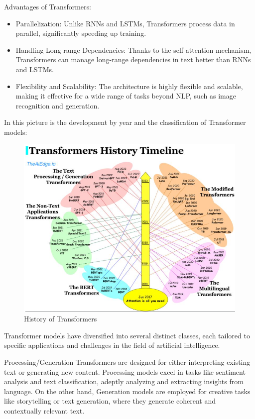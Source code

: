 Advantages of Transformers:

\begin{itemize}
    \item Parallelization: Unlike RNNs and LSTMs, Transformers process data in parallel, significantly speeding up training.
    \item Handling Long-range Dependencies: Thanks to the self-attention mechanism, Transformers can manage long-range dependencies in text better than RNNs and LSTMs.
    \item Flexibility and Scalability: The architecture is highly flexible and scalable, making it effective for a wide range of tasks beyond NLP, such as image recognition and generation.
\end{itemize}

In this picture is the development by year and the classification of Transformer models:

\begin{figure}[h]
    \centering
    \includegraphics[width=0.8\linewidth]{img/chap04/transformer-history.png}
    \caption{History of Transformers}
    \label{fig:transhist}
\end{figure}

Transformer models have diversified into several distinct classes, each tailored to specific applications and challenges in the field of artificial intelligence.

Processing/Generation Transformers are designed for either interpreting existing text or generating new content. Processing models excel in tasks like sentiment analysis and text classification, adeptly analyzing and extracting insights from language. On the other hand, Generation models are employed for creative tasks like storytelling or text generation, where they generate coherent and contextually relevant text.

